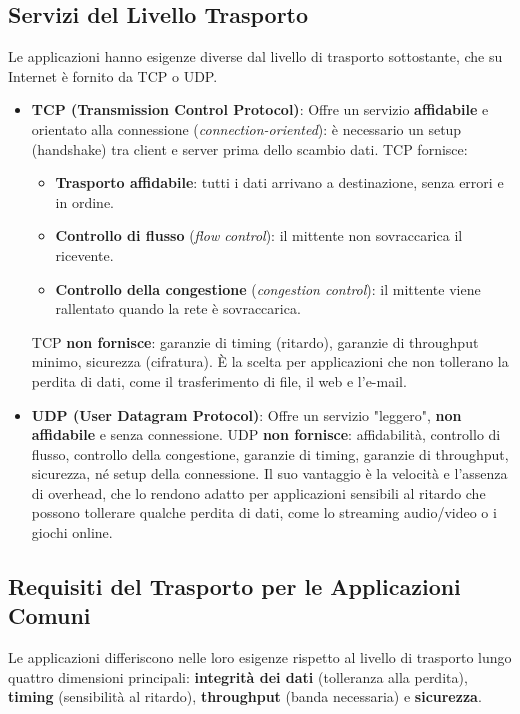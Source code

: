 \subsection{Servizi del Livello Trasporto}
Le applicazioni hanno esigenze diverse dal livello di trasporto sottostante, che su Internet è fornito da TCP o UDP.
\begin{itemize}
    \item \textbf{TCP (Transmission Control Protocol)}: Offre un servizio \textbf{affidabile} e orientato alla connessione (\textit{connection-oriented}): è necessario un setup (handshake) tra client e server prima dello scambio dati. TCP fornisce:
    \begin{itemize}
        \item \textbf{Trasporto affidabile}: tutti i dati arrivano a destinazione, senza errori e in ordine.
        \item \textbf{Controllo di flusso} (\textit{flow control}): il mittente non sovraccarica il ricevente.
        \item \textbf{Controllo della congestione} (\textit{congestion control}): il mittente viene rallentato quando la rete è sovraccarica.
    \end{itemize}
    TCP \textbf{non fornisce}: garanzie di timing (ritardo), garanzie di throughput minimo, sicurezza (cifratura). È la scelta per applicazioni che non tollerano la perdita di dati, come il trasferimento di file, il web e l'e-mail.
    \item \textbf{UDP (User Datagram Protocol)}: Offre un servizio "leggero", \textbf{non affidabile} e senza connessione. UDP \textbf{non fornisce}: affidabilità, controllo di flusso, controllo della congestione, garanzie di timing, garanzie di throughput, sicurezza, né setup della connessione. Il suo vantaggio è la velocità e l'assenza di overhead, che lo rendono adatto per applicazioni sensibili al ritardo che possono tollerare qualche perdita di dati, come lo streaming audio/video o i giochi online.
\end{itemize}


\subsection{Requisiti del Trasporto per le Applicazioni Comuni}
Le applicazioni differiscono nelle loro esigenze rispetto al livello di trasporto lungo quattro dimensioni principali: \textbf{integrità dei dati} (tolleranza alla perdita), \textbf{timing} (sensibilità al ritardo), \textbf{throughput} (banda necessaria) e \textbf{sicurezza}.

